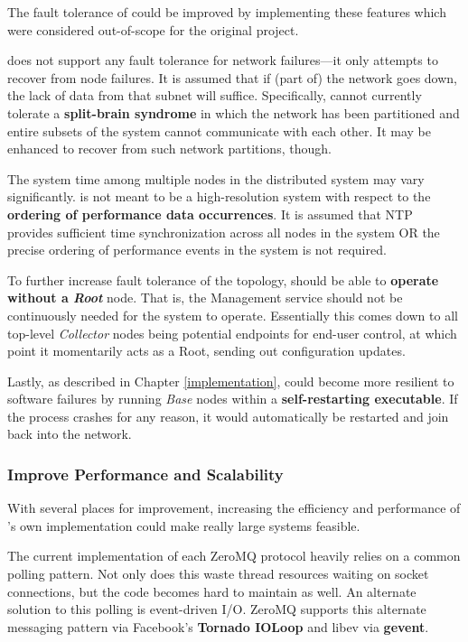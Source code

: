 The fault tolerance of \dcamp could be improved by implementing these features which were considered out-of-scope for
the original project.

\dcamp does not support any fault tolerance for network failures---it only attempts to recover from node failures. It is
assumed that if (part of) the network goes down, the lack of data from that subnet will suffice. Specifically, \dcamp
cannot currently tolerate a \textbf{split-brain syndrome} in which the network has been partitioned and entire subsets
of the system cannot communicate with each other. It may be enhanced to recover from such network partitions, though.

The system time among multiple nodes in the distributed system may vary significantly. \dcamp is not meant to be a
high-resolution system with respect to the \textbf{ordering of performance data occurrences}. It is assumed that NTP
provides sufficient time synchronization across all nodes in the system OR the precise ordering of performance events in
the system is not required.

To further increase fault tolerance of the topology, \dcamp should be able to \textbf{operate without a \textit{Root}}
node. That is, the Management service should not be continuously needed for the system to operate. Essentially this
comes down to all top-level \textit{Collector} nodes being potential endpoints for end-user control, at which point it
momentarily acts as a Root, sending out configuration updates.

Lastly, as described in Chapter \ref{implementation}, \dcamp could become more resilient to software failures by running
\textit{Base} nodes within a \textbf{self-restarting executable}. If the process crashes for any reason, it would
automatically be restarted and join back into the network.

\subsubsection{Improve Performance and Scalability}

With several places for improvement, increasing the efficiency and performance of \dcampns's own implementation could
make really large systems feasible.

The current implementation of each ZeroMQ protocol heavily relies on a common polling pattern. Not only does this waste
thread resources waiting on socket connections, but the code becomes hard to maintain as well. An alternate solution to
this polling is event-driven I/O. ZeroMQ supports this alternate messaging pattern via Facebook's \textbf{Tornado
IOLoop}\cite{tornado}\cite{ioloop} and libev via \textbf{gevent}\cite{gevent}\cite{libev}.


